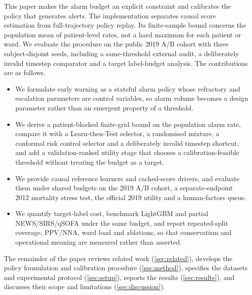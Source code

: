 This paper makes the alarm budget an explicit constraint and calibrates the policy that generates alerts. The implementation separates causal score estimation from full-trajectory policy replay. Its finite-sample bound concerns the population mean of patient-level rates, not a hard maximum for each patient or ward. We evaluate the procedure on the public 2019 A/B cohort with three subject-disjoint seeds, including a same-threshold external audit, a deliberately invalid timestep comparator and a target label-budget analysis. The contributions are as follows.
\begin{itemize}
\item We formulate early warning as a stateful alarm policy whose refractory and escalation parameters are control variables, so alarm volume becomes a design parameter rather than an emergent property of a threshold.
\item We derive a patient-blocked finite-grid bound on the population alarm rate, compare it with a Learn-then-Test selector, a randomised mixture, a conformal risk control selector and a deliberately invalid timestep shortcut, and add a validation-ranked utility stage that chooses a calibration-feasible threshold without treating the budget as a target.
\item We provide causal reference learners and cached-score drivers, and evaluate them under shared budgets on the 2019 A/B cohort, a separate-endpoint 2012 mortality stress test, the official 2019 utility and a human-factors queue.
\item We quantify target-label cost, benchmark LightGBM and partial NEWS/SIRS/qSOFA under the same budget, and report repeated-split coverage, PPV/NNA, ward load and ablations, so that conservatism and operational meaning are measured rather than asserted.
\end{itemize}
The remainder of the paper reviews related work (\cref{sec:related}), develops the policy formulation and calibration procedure (\cref{sec:method}), specifies the datasets and experimental protocol (\cref{sec:setup}), reports the results (\cref{sec:results}), and discusses their scope and limitations (\cref{sec:discussion}).
